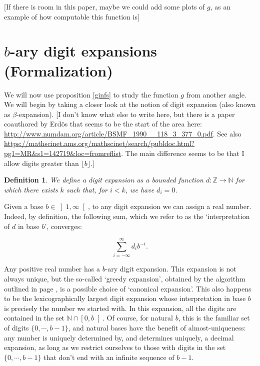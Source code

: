 \documentclass[11pt, reqno]{amsart}
\newcommand{\Z}{\mathbb{Z}}
\newcommand{\N}{\mathbb{N}}
\newtheorem{definition}{Definition}
\begin{document}
[If there is room in this paper, maybe we could add some plots of $g$, as an example of how computable this function is]

\section{$b$-ary digit expansions (Formalization)}\label{sec7}

We will now use proposition \ref{ginfs} to study the function $g$ from another angle. We will begin by taking a closer look at the notion of digit expansion (also known as $\beta$-expansion). [I don't know what else to write here, but there is a paper coauthored by Erdös that seems to be the start of the area here: \url{http://www.numdam.org/article/BSMF_1990__118_3_377_0.pdf}. See also \url{https://mathscinet.ams.org/mathscinet/search/publdoc.html?pg1=MR&s1=142719&loc=fromreflist}. The main difference seems to be that I allow digits greater than $\lfloor b \rfloor$.]

\begin{definition}
We define a \emph{digit expansion} as a \emph{bounded} function $d : \Z \to \N$ for which
there exists $k$ such that, for $i < k$, we have $d_i = 0$.

\end{definition}

Given a base $b \in \left]1, \infty \right[$, to any digit expansion we can assign a real number. Indeed, by definition, the following sum, which we refer to as the `interpretation of $d$ in base $b$', converges:

\[ \sum_{i = -\infty}^\infty d_i b^{-i}.\]

Any positive real number has a $b$-ary digit expansion. This expansion is not always unique, but the so-called `greedy expansion', obtained by the algorithm outlined in page \pageref{digalg}, is a possible choice of `canonical expansion'. This also happens to be the lexicographically largest digit expansion whose interpretation in base $b$ is precisely the number we started with. In this expansion, all the digits are contained in the set $\N \cap \left[0, b \right[$. Of course, for natural $b$, this is the familiar set of digits $\{0, \cdots, b-1 \}$, and natural bases have the benefit of almost-uniqueness: any number is uniquely determined by, and determines uniquely, a decimal expansion, as long as we restrict ourselves to those with digits in the set $\{0, \cdots, b-1 \}$ that don't end with an infinite sequence of $b-1$.
\end{document}
